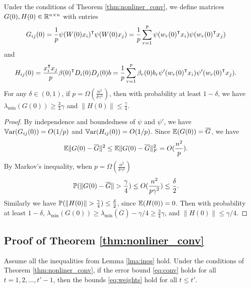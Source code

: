 \begin{lemma}
\label{lma:GH}
Under the conditions of Theorem \ref{thm:nonliner_conv}, we define matrices $G(0),H(0)\in\mathbb{R}^{n\times n}$ with entries
\begin{equation}
\label{eq:def_G0}
G_{ij}(0) = \frac{1}{p}\psi(W(0)x_i)\transpose \psi(W(0)x_j) = \frac{1}{p}\sum_{r=1}^p\psi(w_r(0)\transpose x_i)\psi(w_r(0)\transpose x_j)
\end{equation}
and
\begin{equation}
\label{eq:def_H0}
H_{ij}(0) = \frac{x_i\transpose x_j}{p}\beta(0)\transpose D_i(0)D_j(0)b = \frac{1}{p}\sum_{r=1}^p\beta_r(0)b_r\psi'(w_r(0)\transpose x_i)\psi'(w_r(0)\transpose x_j).
\end{equation}
For any $\delta \in (0,1)$, if $p=\Omega(\frac{n^2}{\delta\gamma^2})$, then with probability at least $1-\delta$, we have $\lambda_{\min}(G(0))\geq \frac{3}{4}\gamma$ and $\|H(0)\|\leq \frac{\gamma}{4}$.
\end{lemma}
\begin{proof}
By independence and boundedness of $\psi$ and $\psi'$, we have $\mathbb{V}\mathrm{ar}(G_{ij}(0)) = O(1/p)$ and $\mathbb{V}\mathrm{ar}(H_{ij}(0)) = O(1/p)$. Since $\mathbb{E}(G(0))=\overline{G}$, we have
\begin{equation*}
\E\|G(0)-\overline{G}\|^2 \leq \E\|G(0)-\overline{G}\|^2_F = O(\frac{n^2}{p}).
\end{equation*}
By Markov's inequality, when $p=\Omega(\frac{n^2}{\delta\gamma^2})$
\begin{equation*}
    \prob(\|G(0)-\overline{G}\|>\frac{\gamma}{4})\leq O(\frac{n^2}{p\gamma^2})\leq\frac{\delta}{2}.
\end{equation*}
Similarly we have $\prob(\|H(0)\|>\frac{\gamma}{4})\leq\frac{\delta}{2}$, since $\mathbb{E}(H(0))=0$. Then with probability at least $1-\delta$, $\lambda_{\min}(G(0)) \geq \lambda_{\min}(\overline{G}) -\gamma/4 \geq \frac{3}{4}\gamma$, and $\|H(0)\|\leq \gamma/4$.
\end{proof}

\subsection{Proof of Theorem \ref{thm:nonliner_conv}}

\begin{lemma}
\label{lma:weights}
Assume all the inequalities from Lemma \ref{lma:inqs} hold. Under the conditions of Theorem \ref{thm:nonliner_conv}, if the error bound \eqref{eq:conv} holds for all $t=1,2,...,t'-1$, then the bounds \eqref{eq:weights} hold for all $t\leq t'$.
\end{lemma}

